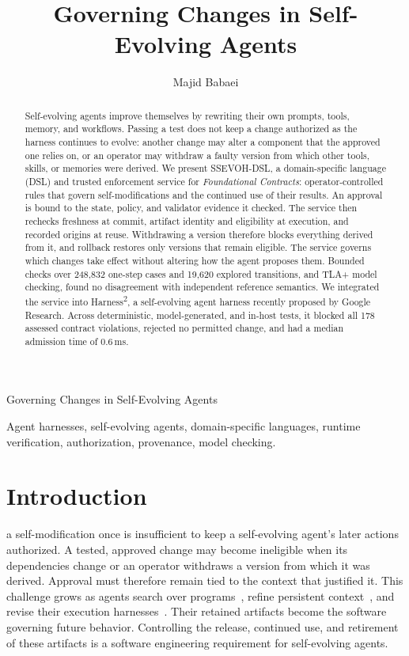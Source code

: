 \documentclass[letterpaper,journal]{IEEEtran}
\newcommand{\tool}{SSEVOH-DSL}
\newcommand{\harness}{Harness\textsuperscript{2}}
\begin{document}
\title{Governing Changes in Self-Evolving Agents}
\author{Majid Babaei}
%
{Governing Changes in Self-Evolving Agents}
\maketitle

\begin{abstract}
Self-evolving agents improve themselves by rewriting their own prompts, tools, memory, and workflows. Passing a test does not keep a change authorized as the harness continues to evolve: another change may alter a component that the approved one relies on, or an operator may withdraw a faulty version from which other tools, skills, or memories were derived. We present \tool{}, a domain-specific language (DSL) and trusted enforcement service for \emph{Foundational Contracts}: operator-controlled rules that govern self-modifications and the continued use of their results. An approval is bound to the state, policy, and validator evidence it checked. The service then rechecks freshness at commit, artifact identity and eligibility at execution, and recorded origins at reuse. Withdrawing a version therefore blocks everything derived from it, and rollback restores only versions that remain eligible. The service governs which changes take effect without altering how the agent proposes them. Bounded checks over 248,832 one-step cases and 19,620 explored transitions, and TLA+ model checking, found no disagreement with independent reference semantics. We integrated the service into \harness{}, a self-evolving agent harness recently proposed by Google Research. Across deterministic, model-generated, and in-host tests, it blocked all 178 assessed contract violations, rejected no permitted change, and had a median admission time of 0.6\,ms.

\end{abstract}
\begin{IEEEkeywords}
Agent harnesses, self-evolving agents, domain-specific languages, runtime verification, authorization, provenance, model checking.
\end{IEEEkeywords}

\section{Introduction}
 a self-modification once is insufficient to keep a self-evolving agent's later actions authorized. A tested, approved change may become ineligible when its dependencies change or an operator withdraws a version from which it was derived. Approval must therefore remain tied to the context that justified it. This challenge grows as agents search over programs~\cite{adas,dgm}, refine persistent context~\cite{ace}, and revise their execution harnesses~\cite{harness2,harnessbank}. Their retained artifacts become the software governing future behavior. Controlling the release, continued use, and retirement of these artifacts is a software engineering requirement for self-evolving agents.
\end{document}
